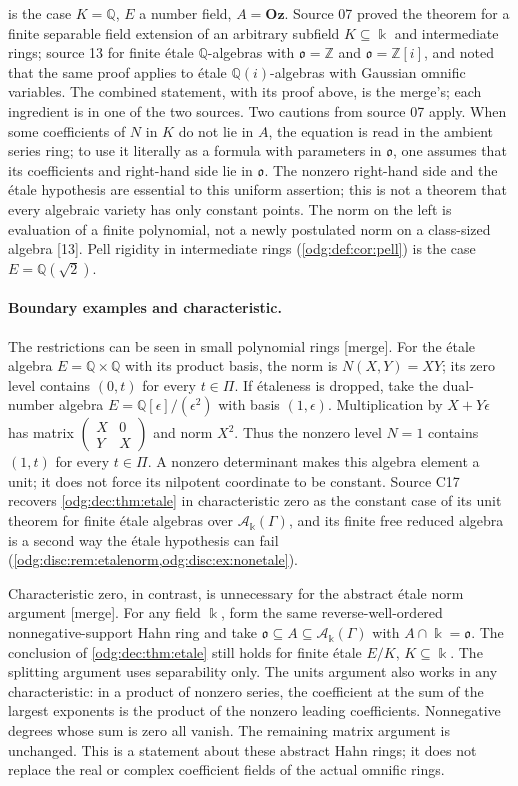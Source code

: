 \documentclass[11pt,oneside]{article}
\numberwithin{equation}{section}
\theoremstyle{definition}
\theoremstyle{remark}
\newcommand{\Oz}{\mathbf{Oz}}
\newcommand{\Z}{\mathbb Z}
\newcommand{\Q}{\mathbb Q}
\newcommand{\src}[1]{\textup{\textsf{\small[#1]}}}
\newcommand{\mergetag}{\textup{\textsf{\small[merge]}}}
\newcommand{\crA}{\mathcal A_\Bbbk(\Gamma)}
\begin{document}
 is the case $K=\Q$, $E$ a number field, $A=\Oz$. Source
07 proved the theorem for a finite separable field extension of an arbitrary
subfield $K\subseteq\Bbbk$ and intermediate rings; source 13 for finite
\'etale $\Q$-algebras with $\mathfrak o=\Z$ and $\mathfrak o=\Z[i]$, and noted
that the same proof applies to \'etale $\Q(i)$-algebras with Gaussian omnific
variables. The combined statement, with its proof above, is the merge's; each
ingredient is in one of the two sources. Two cautions from source 07 apply.
When some coefficients of $N$ in $K$ do not lie in $A$, the equation is read
in the ambient series ring; to use it literally as a formula with parameters
in $\mathfrak o$, one assumes that its coefficients and right-hand side lie in
$\mathfrak o$. The nonzero right-hand side and the \'etale hypothesis are
essential to this uniform assertion; this is not a theorem that every
algebraic variety has only constant points.
The norm on the left is evaluation of a finite polynomial, not a newly
postulated norm on a class-sized algebra \src{13}. Pell rigidity in
intermediate rings (\cref{odg:def:cor:pell}) is the case $E=\Q(\sqrt2)$.

\paragraph{Boundary examples and characteristic.}
The restrictions can be seen in small polynomial rings \mergetag.
For the \'etale algebra $E=\Q\times\Q$ with its product basis, the norm
is $N(X,Y)=XY$; its zero level contains $(0,t)$ for every $t\in\Pi$.
If \'etaleness is dropped, take the dual-number algebra
$E=\Q[\epsilon]/(\epsilon^2)$ with basis $(1,\epsilon)$. Multiplication
by $X+Y\epsilon$ has matrix
$\left(\begin{smallmatrix}X&0\\Y&X\end{smallmatrix}\right)$ and norm
$X^2$. Thus the nonzero level $N=1$ contains $(1,t)$ for every
$t\in\Pi$. A nonzero determinant makes this algebra element a unit;
it does not force its nilpotent coordinate to be constant.
Source C17 recovers \cref{odg:dec:thm:etale} in characteristic zero as the constant case of
its unit theorem for finite \'etale algebras over $\crA$, and its finite free reduced
algebra is a second way the \'etale hypothesis can fail
(\cref{odg:disc:rem:etalenorm,odg:disc:ex:nonetale}).

Characteristic zero, in contrast, is unnecessary for the abstract
\'etale norm argument \mergetag. For any field $\Bbbk$, form the same
reverse-well-ordered nonnegative-support Hahn ring and take
$\mathfrak o\subseteq A\subseteq\mathcal A_\Bbbk(\Gamma)$ with
$A\cap\Bbbk=\mathfrak o$. The conclusion of
\cref{odg:dec:thm:etale} still holds for finite \'etale $E/K$,
$K\subseteq\Bbbk$. The splitting argument uses separability only.
The units argument also works in any characteristic: in a product of
nonzero series, the coefficient at the sum of the largest exponents
is the product of the nonzero leading coefficients. Nonnegative degrees
whose sum is zero all vanish. The remaining matrix argument is unchanged.
This is a statement about these abstract Hahn rings; it does not replace
the real or complex coefficient fields of the actual omnific rings.
\end{document}
